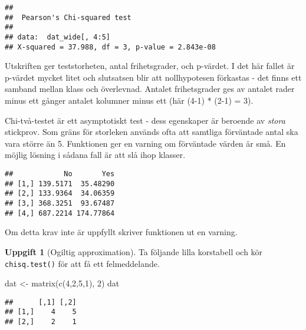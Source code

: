 \documentclass[
]{book}
\newenvironment{Shaded}{\begin{snugshade}}{\end{snugshade}}
\newcommand{\CommentTok}[1]{\textcolor[rgb]{0.56,0.35,0.01}{\textit{#1}}}
\newcommand{\DecValTok}[1]{\textcolor[rgb]{0.00,0.00,0.81}{#1}}
\newcommand{\FunctionTok}[1]{\textcolor[rgb]{0.00,0.00,0.00}{#1}}
\newcommand{\NormalTok}[1]{#1}
\newcommand{\OtherTok}[1]{\textcolor[rgb]{0.56,0.35,0.01}{#1}}
\newcommand{\SpecialCharTok}[1]{\textcolor[rgb]{0.00,0.00,0.00}{#1}}
\theoremstyle{definition}
\theoremstyle{definition}
\theoremstyle{definition}
\newtheorem{exercise}{Uppgift}[chapter]
\theoremstyle{definition}
\theoremstyle{remark}
\begin{document}
\begin{verbatim}
## 
##  Pearson's Chi-squared test
## 
## data:  dat_wide[, 4:5]
## X-squared = 37.988, df = 3, p-value = 2.843e-08
\end{verbatim}

Utskriften ger teststorheten, antal frihetsgrader, och p-värdet. I det här fallet är p-värdet mycket litet och slutsatsen blir att nollhypotesen förkastas - det finns ett samband mellan klass och överlevnad. Antalet frihetsgrader ges av antalet rader minus ett gånger antalet kolumner minus ett (här (4-1) * (2-1) = 3).

Chi-två-testet är ett asymptotiskt test - dess egenskaper är beroende av \emph{stora} stickprov. Som gräns för storleken används ofta att samtliga förväntade antal ska vara större än 5. Funktionen ger en varning om förväntade värden är små. En möjlig lösning i sådana fall är att slå ihop klasser.

\begin{Shaded}
\end{Shaded}

\begin{verbatim}
##            No       Yes
## [1,] 139.5171  35.48290
## [2,] 133.9364  34.06359
## [3,] 368.3251  93.67487
## [4,] 687.2214 174.77864
\end{verbatim}

Om detta krav inte är uppfyllt skriver funktionen ut en varning.

\begin{exercise}[Ogiltig approximation]

Ta följande lilla korstabell och kör \texttt{chisq.test()} för att få ett felmeddelande.

\begin{Shaded}
\begin{Highlighting}[]
\NormalTok{dat }\OtherTok{\textless{}{-}} \FunctionTok{matrix}\NormalTok{(}\FunctionTok{c}\NormalTok{(}\DecValTok{4}\NormalTok{,}\DecValTok{2}\NormalTok{,}\DecValTok{5}\NormalTok{,}\DecValTok{1}\NormalTok{), }\DecValTok{2}\NormalTok{)}
\NormalTok{dat}
\end{Highlighting}
\end{Shaded}

\begin{verbatim}
##      [,1] [,2]
## [1,]    4    5
## [2,]    2    1
\end{verbatim}

\end{exercise}
\end{document}
